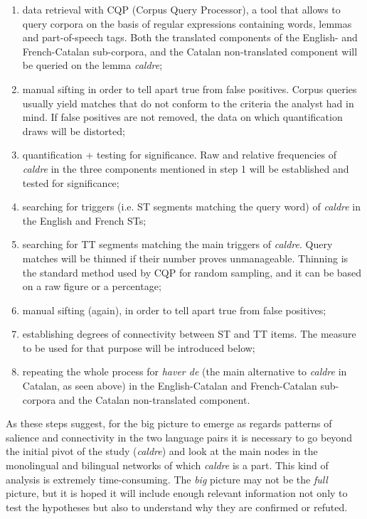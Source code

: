 \documentclass[output=paper,english,spanish,german,english]{langsci/langscibook}
\begin{document}
\begin{enumerate}
  \item data retrieval with CQP (Corpus Query Processor), a tool that allows to query corpora on the basis of regular expressions containing words, lemmas and part-of-speech tags. Both the translated components of the Eng\-lish- and French-Catalan sub-corpora, and the Catalan non-translated component will be queried on the lemma \textit{caldre};
  \item manual sifting in order to tell apart true from false positives. Corpus que\-ries usually yield matches that do not conform to the criteria the analyst had in mind. If false positives are not removed, the data on which quantification draws will be distorted;
  \item quantification + testing for significance. Raw and relative frequencies of \textit{caldre} in the three components mentioned in step 1 will be established and tested for significance;
  \item searching for triggers (i.e. ST segments matching the query word) of \textit{caldre} in the English and French STs;
  \item searching for TT segments matching the main triggers of \textit{caldre}. Query matches will be thinned if their number proves unmanageable. Thinning is the standard method used by CQP for random sampling, and it can be based on a raw figure or a percentage;
  \item manual sifting (again), in order to tell apart true from false positives;
  \item establishing degrees of connectivity between ST and TT items. The measure to be used for that purpose will be introduced below;
  \item repeating the whole process for \textit{haver de} (the main alternative to \textit{caldre} in Catalan, as seen above) in the English-Catalan and French-Catalan sub-corpora and the Catalan non-translated component.
\end{enumerate}

As these steps suggest, for the big picture to emerge as regards patterns of salience and connectivity in the two language pairs it is necessary to go beyond the initial pivot of the study (\textit{caldre}) and look at the main nodes in the monolingual and bilingual networks of which \textit{caldre} is a part. This kind of analysis is extremely time-consuming. The \textit{big} picture may not be the \textit{full} picture, but it is hoped it will include enough relevant information not only to test the hypotheses but also to understand why they are confirmed or refuted.
\end{document}

